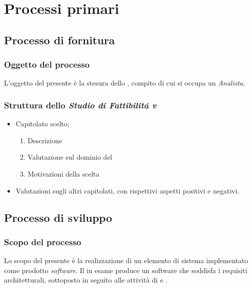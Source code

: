 \section{Processi primari}

	\subsection{Processo di fornitura}	
	\subsubsection{Oggetto del processo}
	L'oggetto del presente  è la stesura dello \StudioDiFattibilita, compito
	di cui si occupa un \textit{Analista}.
	\subsubsection{Struttura dello \textit{Studio di Fattibilit\'a v\VersioneSF{}}}
		\begin{itemize}
			\item Capitolato scelto;
				\begin{enumerate}
					\item Descrizione
					\item Valutazione sul dominio del 
					\item Motivazioni della scelta
				\end{enumerate}	
			\item Valutazioni sugli altri capitolati, con rispettivi aspetti positivi e negativi.
		\end{itemize}


	\subsection{Processo di sviluppo}
        \subsubsection{Scopo del processo}
        Lo scopo del presente  \`e la realizzazione di un elemento di sistema implementato come prodotto
        \textit{software}. Il  in esame produce un software che soddisfa i requisiti architetturali, sottoposto
        in seguito alle attivit\`a di  e .
